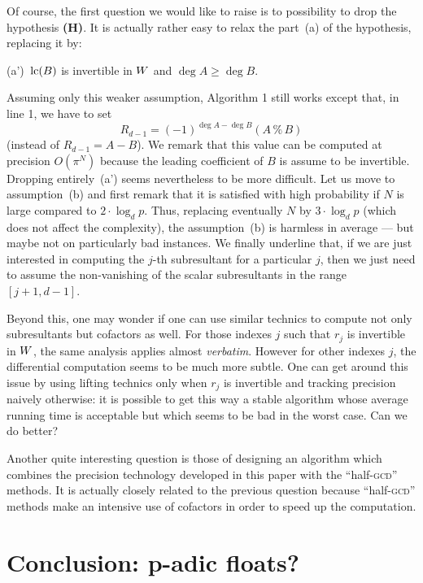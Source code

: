 \documentclass{sig-alternate}
\begin{document}
Of course, the first question we would like to raise is to possibility 
to drop the hypothesis {\bf (H)}. It is actually rather easy to relax
the part~(a) of the hypothesis, replacing it by:

\medskip

(a')~$\text{\rm lc}(B)$ is invertible in $W$ and $\deg A \geq \deg B$.

\medskip

\noindent
Assuming only this weaker assumption, Algorithm 1 still works except 
that, in line 1, we have to set
$$R_{d-1} = (-1)^{\deg A - \deg B} (A \,\%\, B)$$
(instead of $R_{d-1} = A-B$).
We remark that this value can be computed at precision $O(\pi^N)$
because the leading coefficient of $B$ is assume to be invertible.
Dropping entirely~(a') seems nevertheless to be more difficult. Let us 
move to assumption~(b) and first remark that it is satisfied with high 
probability if $N$ is large compared to $2 \cdot \log_d p$. Thus, 
replacing eventually $N$ by $3 \cdot \log_d p$ (which does not affect 
the complexity), the assumption~(b) is harmless in average --- but maybe
not on particularly bad instances. We finally underline that, if we are
just interested in computing the $j$-th subresultant for a particular
$j$, then we just need to assume the non-vanishing of the scalar
subresultants in the range $[j{+}1, d{-}1]$.

Beyond this, one may wonder if one can use similar technics to compute 
not only subresultants but cofactors as well. For those indexes $j$ such 
that $r_j$ is invertible in $W$, the same analysis applies almost 
\emph{verbatim}. However for other indexes $j$, the differential 
computation seems to be much more subtle. One can get around this issue 
by using lifting technics only when $r_j$ is invertible and tracking 
precision naively otherwise: it is possible to get this way a stable 
algorithm whose average running time is acceptable but which seems to be 
bad in the worst case. Can we do better?

Another quite interesting question is those of designing an algorithm 
which combines the precision technology developed in this paper with the 
``half-\textsc{gcd}'' methods. It is actually closely related to the 
previous question because ``half-\textsc{gcd}'' methods make an 
intensive use of cofactors in order to speed up the computation.

\section{Conclusion: p-adic floats?}
\end{document}
